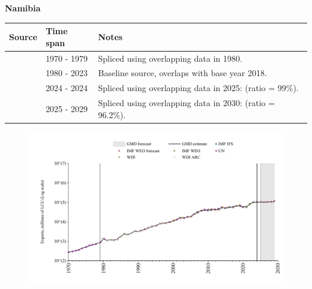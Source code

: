 \documentclass[12pt,a4paper,landscape]{article}
\begin{document}
\begin{adjustbox}{max totalsize={\paperwidth}{\paperheight},center}
\begin{minipage}[t][\textheight][t]{\textwidth}
\vspace*{0.5cm}
{}
\begin{center}
{\Large\bfseries Namibia}
\end{center}
\vspace{0.5cm}
\begin{table}[H]
\centering
\small
\begin{tabular}{|l|l|l|}
\hline
\textbf{Source} & \textbf{Time span} & \textbf{Notes} \\
\hline
\rowcolor{white}\cite{UN}& 1970 - 1979 &Spliced using overlapping data in 1980.\\
\rowcolor{lightgray}\cite{WDI}& 1980 - 2023 &Baseline source, overlaps with base year 2018.\\
\rowcolor{white}\cite{IMF_IFS}& 2024 - 2024 &Spliced using overlapping data in 2025: (ratio = 99\%).\\
\rowcolor{lightgray}\cite{IMF_WEO_forecast}& 2025 - 2029 &Spliced using overlapping data in 2030: (ratio = 96.2\%).\\
\hline
\end{tabular}
\end{table}
\begin{figure}[H]
\centering
\includegraphics[width=\textwidth,height=0.6\textheight,keepaspectratio]{graphs/NAM_exports.pdf}
\end{figure}
\end{minipage}
\end{adjustbox}
\end{document}

